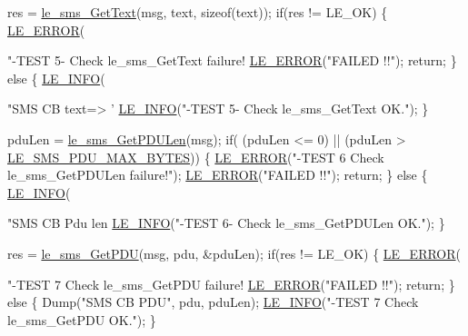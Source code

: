 \begin{DoxyCodeInclude}
{{{{{{{{{{{{        res = \hyperlink{le__sms__interface_8h_aebf0c28efce6ec0b9616ffa8ecb80782}{le\_sms\_GetText}(msg, text, \textcolor{keyword}{sizeof}(text));
        \textcolor{keywordflow}{if}(res != LE\_OK)
        \{
            \hyperlink{le__log_8h_a353590f91b3143a7ba3a416ae5a50c3d}{LE\_ERROR}(\textcolor{stringliteral}{"-TEST  5- Check le\_sms\_GetText failure! %
            \hyperlink{le__log_8h_a353590f91b3143a7ba3a416ae5a50c3d}{LE\_ERROR}(\textcolor{stringliteral}{"FAILED !!"});
            \textcolor{keywordflow}{return};
        \}
        \textcolor{keywordflow}{else}
        \{
            \hyperlink{le__log_8h_a23e6d206faa64f612045d688cdde5808}{LE\_INFO}(\textcolor{stringliteral}{"SMS CB text=> '%
            \hyperlink{le__log_8h_a23e6d206faa64f612045d688cdde5808}{LE\_INFO}(\textcolor{stringliteral}{"-TEST  5- Check le\_sms\_GetText OK."});
        \}

        pduLen = \hyperlink{le__sms__interface_8h_abb89b302e564f3d55d604bb0c0dda022}{le\_sms\_GetPDULen}(msg);
        \textcolor{keywordflow}{if}( (pduLen <= 0) || (pduLen > \hyperlink{le__sms__interface_8h_aaa740f36bbc6d13d0b355d3dc2d8d4dc}{LE\_SMS\_PDU\_MAX\_BYTES}))
        \{
            \hyperlink{le__log_8h_a353590f91b3143a7ba3a416ae5a50c3d}{LE\_ERROR}(\textcolor{stringliteral}{"-TEST  6 Check le\_sms\_GetPDULen failure!"});
            \hyperlink{le__log_8h_a353590f91b3143a7ba3a416ae5a50c3d}{LE\_ERROR}(\textcolor{stringliteral}{"FAILED !!"});
            \textcolor{keywordflow}{return};
        \}
        \textcolor{keywordflow}{else}
        \{
            \hyperlink{le__log_8h_a23e6d206faa64f612045d688cdde5808}{LE\_INFO}(\textcolor{stringliteral}{"SMS CB Pdu len %
            \hyperlink{le__log_8h_a23e6d206faa64f612045d688cdde5808}{LE\_INFO}(\textcolor{stringliteral}{"-TEST  6- Check le\_sms\_GetPDULen OK."});
        \}

        res = \hyperlink{le__sms__interface_8h_a77555788d56f73fa52f56904cd39cd2f}{le\_sms\_GetPDU}(msg, pdu, &pduLen);
        \textcolor{keywordflow}{if}(res != LE\_OK)
        \{
            \hyperlink{le__log_8h_a353590f91b3143a7ba3a416ae5a50c3d}{LE\_ERROR}(\textcolor{stringliteral}{"-TEST  7 Check le\_sms\_GetPDU failure! %
            \hyperlink{le__log_8h_a353590f91b3143a7ba3a416ae5a50c3d}{LE\_ERROR}(\textcolor{stringliteral}{"FAILED !!"});
            \textcolor{keywordflow}{return};
        \}
        \textcolor{keywordflow}{else}
        \{
            Dump(\textcolor{stringliteral}{"SMS CB PDU"}, pdu, pduLen);
            \hyperlink{le__log_8h_a23e6d206faa64f612045d688cdde5808}{LE\_INFO}(\textcolor{stringliteral}{"-TEST  7 Check le\_sms\_GetPDU OK."});
        \}

}}}}}}}}}}}}}}}}
\end{DoxyCodeInclude}

